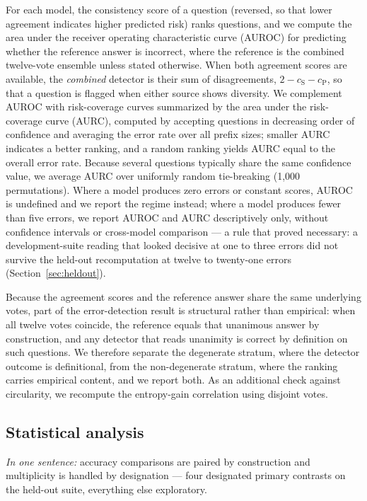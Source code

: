 For each model, the consistency score of a question (reversed, so that lower agreement indicates higher predicted risk) ranks questions, and we compute the area under the receiver operating characteristic curve (AUROC) for predicting whether the reference answer is incorrect, where the reference is the combined twelve-vote ensemble unless stated otherwise. When both agreement scores are available, the \emph{combined} detector is their sum of disagreements, $2 - c_{\mathrm{S}} - c_{\mathrm{P}}$, so that a question is flagged when either source shows diversity. We complement AUROC with risk-coverage curves summarized by the area under the risk-coverage curve (AURC), computed by accepting questions in decreasing order of confidence and averaging the error rate over all prefix sizes; smaller AURC indicates a better ranking, and a random ranking yields AURC equal to the overall error rate. Because several questions typically share the same confidence value, we average AURC over uniformly random tie-breaking (1{,}000 permutations). Where a model produces zero errors or constant scores, AUROC is undefined and we report the regime instead; where a model produces fewer than five errors, we report AUROC and AURC descriptively only, without confidence intervals or cross-model comparison --- a rule that proved necessary: a development-suite reading that looked decisive at one to three errors did not survive the held-out recomputation at twelve to twenty-one errors (Section~\ref{sec:heldout}).

Because the agreement scores and the reference answer share the same underlying votes, part of the error-detection result is structural rather than empirical: when all twelve votes coincide, the reference equals that unanimous answer by construction, and any detector that reads unanimity is correct by definition on such questions. We therefore separate the degenerate stratum, where the detector outcome is definitional, from the non-degenerate stratum, where the ranking carries empirical content, and we report both. As an additional check against circularity, we recompute the entropy-gain correlation using disjoint votes.

\subsection{Statistical analysis}
\label{sec:stats}

\emph{In one sentence:} accuracy comparisons are paired by construction and multiplicity is handled by designation --- four designated primary contrasts on the held-out suite, everything else exploratory.

